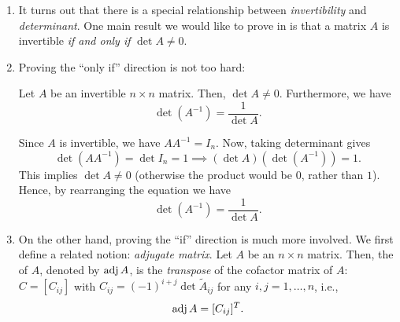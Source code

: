 \begin{enumerate}
\item It turns out that there is a special relationship between
\emph{invertibility} and \emph{determinant}. One main result we would like to
prove in  is that a matrix \(A\) is invertible
\emph{if and only if} \(\det A\ne 0\).

\item Proving the ``only if'' direction is not too hard:
\begin{proposition}
\label{prp:det-inv-fmla}
Let \(A\) be an invertible \(n\times n\) matrix. Then, \(\det A\ne 0\).
Furthermore, we have
\[
\det(A^{-1})=\frac{1}{\det A}.
\]
\end{proposition}
\begin{pf}
Since \(A\) is invertible, we have \(AA^{-1}=I_n\). Now, taking determinant gives
\[
\det(AA^{-1})=\det I_n=1
\implies
(\det A)(\det(A^{-1}))=1.
\]
This implies \(\det A\ne 0\) (otherwise the product would be \(0\), rather than
\(1\)).  Hence, by rearranging the equation we have
\[
\det(A^{-1})=\frac{1}{\det A}.
\]
\end{pf}

\item On the other hand, proving the ``if'' direction is much more involved. We
first define a related notion: \emph{adjugate matrix}. Let \(A\) be an
\(n\times n\) matrix. Then, the  of \(A\), denoted by \(\operatorname{adj}
A\), is the \emph{transpose} of the cofactor matrix of \(A\): \(C=[C_{ij}]\)
with \(C_{ij}=(-1)^{i+j}\det\widetilde{A}_{ij}\) for any \(i,j=1,\dotsc,n\),
i.e.,
\[
\operatorname{adj} A=[C_{ij}]^{T}.
\]


\end{enumerate}
